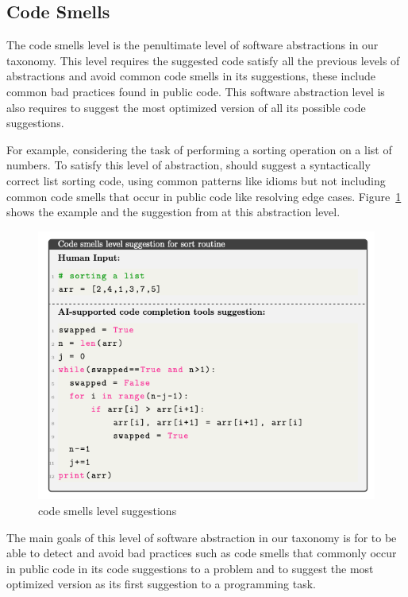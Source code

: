 \subsection{Code Smells}
The code smells level is the penultimate level of software abstractions in our taxonomy. 
This level requires the suggested code satisfy all the previous levels of abstractions and avoid common code smells in its suggestions, these include common bad practices found in public code. This software abstraction level is also requires \cct{} to suggest the most optimized version of all its possible code suggestions.

For example, considering the task of performing a sorting operation on a list of numbers. To satisfy this level of abstraction, \cct{} should suggest a syntactically correct list sorting code, using common patterns like idioms but not including common code smells that occur in public code like resolving edge cases. 
Figure~\ref{fig:smells} shows the example and the suggestion from \cct{} at this abstraction level.

\begin{figure}[hbt!]
    \centering
    \includegraphics[width=\linewidth]{Figures/smells.png}
    \caption{\cct{} code smells level suggestions}
    \label{fig:smells}
\end{figure}

The main goals of this level of software abstraction in our taxonomy is for \cct{} to be able to detect and avoid bad practices such as code smells that commonly occur in public code in its code suggestions to a problem and to suggest the most optimized version as its first suggestion to a programming task.

